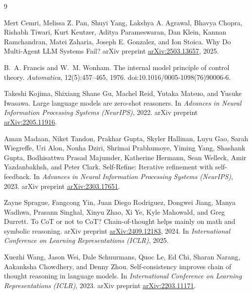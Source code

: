 \documentclass{article}
\begin{document}

\begin{thebibliography}{9}

Mert Cemri, Melissa Z. Pan, Shuyi Yang, Lakshya A. Agrawal,
Bhavya Chopra, Rishabh Tiwari, Kurt Keutzer, Aditya Parameswaran,
Dan Klein, Kannan Ramchandran, Matei Zaharia, Joseph E. Gonzalez,
and Ion Stoica.
\newblock Why Do Multi-Agent {LLM} Systems Fail?
\newblock arXiv preprint
\href{https://arxiv.org/abs/2503.13657}{arXiv:2503.13657}, 2025.

B.~A. Francis and W.~M. Wonham.
\newblock The internal model principle of control theory.
\newblock \emph{Automatica}, 12(5):457--465, 1976.
\newblock doi:10.1016/0005-1098(76)90006-6.

Takeshi Kojima, Shixiang Shane Gu, Machel Reid, Yutaka Matsuo,
and Yusuke Iwasawa.
\newblock Large language models are zero-shot reasoners.
\newblock In \emph{Advances in Neural Information Processing
  Systems (NeurIPS)}, 2022.
\newblock arXiv preprint
\href{https://arxiv.org/abs/2205.11916}{arXiv:2205.11916}.

Aman Madaan, Niket Tandon, Prakhar Gupta, Skyler Hallinan, Luyu
Gao, Sarah Wiegreffe, Uri Alon, Nouha Dziri, Shrimai Prabhumoye,
Yiming Yang, Shashank Gupta, Bodhisattwa Prasad Majumder, Katherine
Hermann, Sean Welleck, Amir Yazdanbakhsh, and Peter Clark.
\newblock Self-Refine: Iterative refinement with self-feedback.
\newblock In \emph{Advances in Neural Information Processing
  Systems (NeurIPS)}, 2023.
\newblock arXiv preprint
\href{https://arxiv.org/abs/2303.17651}{arXiv:2303.17651}.

Zayne Sprague, Fangcong Yin, Juan Diego Rodriguez, Dongwei Jiang,
Manya Wadhwa, Prasann Singhal, Xinyu Zhao, Xi Ye, Kyle Mahowald,
and Greg Durrett.
\newblock To {CoT} or not to {CoT}? Chain-of-thought helps mainly
on math and symbolic reasoning.
\newblock arXiv preprint
\href{https://arxiv.org/abs/2409.12183}{arXiv:2409.12183}, 2024.
\newblock In \emph{International Conference on Learning
  Representations (ICLR)}, 2025.

Xuezhi Wang, Jason Wei, Dale Schuurmans, Quoc Le, Ed Chi, Sharan
Narang, Aakanksha Chowdhery, and Denny Zhou.
\newblock Self-consistency improves chain of thought reasoning in
language models.
\newblock In \emph{International Conference on Learning
  Representations (ICLR)}, 2023.
\newblock arXiv preprint
\href{https://arxiv.org/abs/2203.11171}{arXiv:2203.11171}.


\end{thebibliography}
\end{document}

